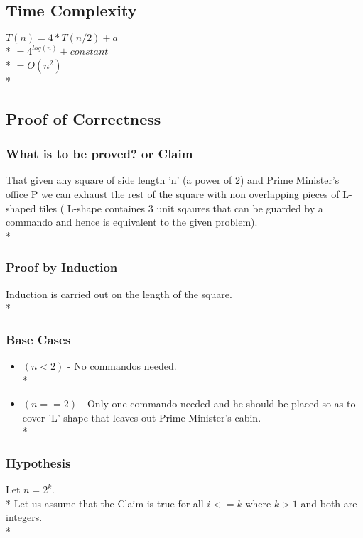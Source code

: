 \documentclass{article}
\begin{document}
\begin{itemize}
\subsection{Time Complexity}
\begin{center}
$ T(n) = 4*T(n/2) + a $ \\*
$ = 4^{log(n)} + constant $ \\*
$ = O(n^2) $ \\*
\end{center}
\subsection{Proof of Correctness}
\subsubsection{What is to be proved? or Claim}
That given any square of side length 'n' (a power of 2)  and Prime Minister's office P we can exhaust the rest of the square with non overlapping pieces of L-shaped tiles ( L-shape containes 3 unit sqaures that can be guarded by a commando and hence is equivalent to the given problem).  \\*
\subsubsection{Proof by Induction}
Induction is carried out on the length of the square. \\*
\subsubsection{Base Cases}
\begin{itemize}
\item $(n<2)$ - No commandos needed. \\*
\item $(n==2)$ - Only one commando needed and he should be placed so as to cover 'L' shape that leaves out Prime Minister's cabin. \\*
\end{itemize}
\subsubsection{Hypothesis}
Let $ n = 2^{k} $. \\*
Let us assume that the Claim is true for all $i<=k$ where $k>1$ and both are integers. \\*

\end{itemize}
\end{document}
